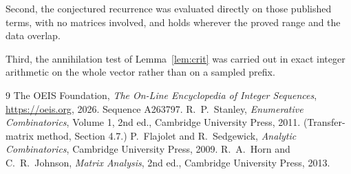 \documentclass[11pt,a4paper]{article}
\theoremstyle{plain}
\theoremstyle{definition}
\begin{document}
Second, the conjectured recurrence was evaluated directly on those published terms, with no
matrices involved, and holds wherever the proved range and the data overlap.

Third, the annihilation test of Lemma~\ref{lem:crit} was carried out in exact integer
arithmetic on the whole vector rather than on a sampled prefix.

\begin{thebibliography}{9}
 The OEIS Foundation, \emph{The On-Line Encyclopedia of Integer
Sequences}, \url{https://oeis.org}, 2026. Sequence A263797.
 R.~P.~Stanley, \emph{Enumerative Combinatorics}, Volume 1, 2nd ed.,
Cambridge University Press, 2011. (Transfer-matrix method, Section 4.7.)
 P.~Flajolet and R.~Sedgewick, \emph{Analytic Combinatorics}, Cambridge
University Press, 2009.
 R.~A.~Horn and C.~R.~Johnson, \emph{Matrix Analysis}, 2nd ed., Cambridge
University Press, 2013.
\end{thebibliography}
\end{document}
